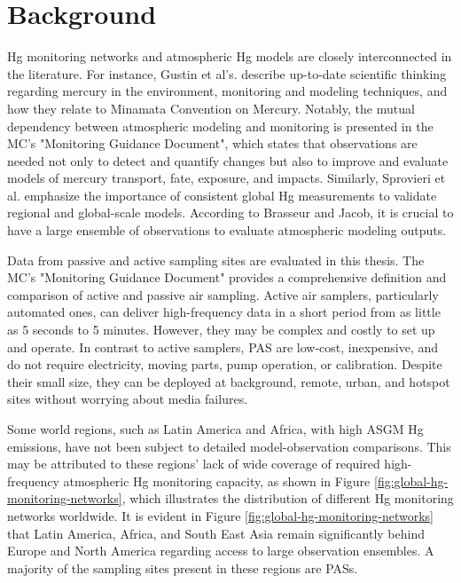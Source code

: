 \section{Background}\label{chapter2_background}
\begin{flushleft}

Hg monitoring networks and atmospheric Hg models are closely interconnected in the literature. For instance, Gustin et al's.\cite{gustin_mercury_2020} describe up-to-date scientific thinking regarding mercury in the environment, monitoring and modeling techniques, and how they relate to Minamata Convention on Mercury.  Notably, the mutual dependency between atmospheric modeling and monitoring is presented in the MC's "Monitoring Guidance Document"\cite{unep_guidance_2021}, which states that observations are needed not only to detect and quantify changes but also to improve and evaluate models of mercury transport, fate, exposure, and impacts\cite{unep_guidance_2021}. Similarly, Sprovieri et al.\cite{sprovieri_atmospheric_2016} emphasize the importance of consistent global Hg measurements to validate regional and global-scale models.  According to Brasseur and Jacob\cite{brasseur_modeling_2017}, it is crucial to have a large ensemble of observations to evaluate atmospheric modeling outputs.

\end{flushleft}
Data from passive and active sampling sites are evaluated in this thesis. The MC's "Monitoring Guidance Document"\cite{unep_guidance_2021} provides a comprehensive definition and comparison of active and passive air sampling. Active air samplers, particularly automated ones, can deliver high-frequency data in a short period from as little as 5 seconds to 5 minutes\cite{unep_guidance_2021}. However, they may be complex and costly to set up and operate. In contrast to active samplers, PAS are low-cost, inexpensive, and do not require electricity, moving parts, pump operation, or calibration\cite{macagnano_passive_2018}. Despite their small size, they can be deployed at background, remote, urban, and hotspot sites without worrying about media failures\cite{unep_guidance_2021}. 
\begin{flushleft}
\end{flushleft}

\begin{flushleft}
Some world regions, such as Latin America and Africa, with high ASGM Hg emissions, have not been subject to detailed model-observation comparisons. This may be attributed to these regions' lack of wide coverage of required high-frequency atmospheric Hg monitoring capacity, as shown in Figure \ref{fig:global-hg-monitoring-networks}, which illustrates the distribution of different Hg monitoring networks worldwide\cite{united_nations_environment_programme_technical_2019}. It is evident in Figure \ref{fig:global-hg-monitoring-networks} that Latin America, Africa, and South East Asia remain significantly behind Europe and North America regarding access to large observation ensembles. A majority of the sampling sites present in these regions are PASs. 
\end{flushleft}

